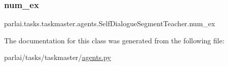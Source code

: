\subsubsection{\texorpdfstring{num\+\_\+ex}{num\_ex}}
{\footnotesize\ttfamily parlai.\+tasks.\+taskmaster.\+agents.\+Self\+Dialogue\+Segment\+Teacher.\+num\+\_\+ex}



The documentation for this class was generated from the following file\+:\begin{DoxyCompactItemize}
\item 
parlai/tasks/taskmaster/\hyperlink{parlai_2tasks_2taskmaster_2agents_8py}{agents.\+py}\end{DoxyCompactItemize}
